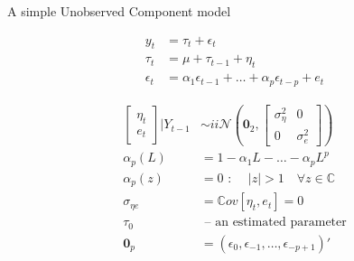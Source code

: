 \documentclass[notes,blackandwhite,mathsans,usenames,dvipsnames]{beamer}
\begin{document}
\begin{frame}{A simple Unobserved Component model}

\begin{align}
y_t &= \tau_t + \epsilon_t\\[1ex]
\tau_t &= \mu + \tau_{t-1} + \eta_t\\[1ex]
\epsilon_t &= \alpha_1\epsilon_{t-1} + \dots + \alpha_p\epsilon_{t-p} +  e_t
\end{align}

\begin{align*}
\begin{bmatrix}\eta_t \\ e_t\end{bmatrix}\bigg|Y_{t-1} &\sim ii\mathcal{N}\left(\mathbf{0}_2, \begin{bmatrix}\sigma_\eta^2 & 0 \\ 0 & \sigma_e^2\end{bmatrix} \right)\\[1ex]
\alpha_p(L) &= 1-\alpha_1L - \dots - \alpha_pL^p\\[1ex]
\alpha_p(z)&=0\text{ : }\quad  |z|>1\quad\forall z\in\mathbb{C}\\[1ex]
\sigma_{\eta e}&= \mathbb{C}ov[\eta_t,e_t]=0\\[1ex]
\tau_0 &\text{ -- an estimated parameter}\\[1ex]
\mathbf{0}_p &= (\epsilon_{0}, \epsilon_{-1}, \dots, \epsilon_{-p+1})'
\end{align*}

\end{frame}
\end{document}
